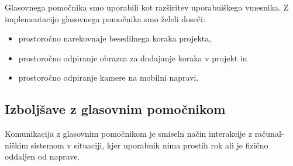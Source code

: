 \documentclass[a4paper, 12pt]{book}
\begin{document}
Glasovnega pomočnika smo uporabili kot razširitev uporabniškega vmesnika.
Z implementacijo glasovnega pomočnika smo želeli doseči:
\begin{itemize}
	\item prostoročno narekovnaje besedilnega koraka projekta,
	\item prostoročno odpiranje obrazca za dodajanje koraka v projekt in
	\item prostoročno odpiranje kamere na mobilni napravi.
\end{itemize}


 
 
 





\subsection{Izboljšave z glasovnim pomočnikom}

Komunikacija z glasovnim pomočnikom je smiseln način interakcije z računal-\\niškim sistemom v situaciji, kjer uporabnik nima prostih rok ali je fizično oddaljen od naprave.

\end{document}
